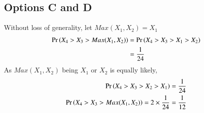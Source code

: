 \documentclass[journal,12pt,twocolumn]{IEEEtran}
\theoremstyle{definition}
\begin{document}
\subsection*{\textbf{Options C and D}}      
Without loss of generality, let $Max(X_1,X_2) = X_1$
\begin{align}
    \Pr\left(X_4 > X_3 > Max(X_1,X_2)\right) &= \Pr\left(X_4 > X_3 > X_1 > X_2\right)\\ &= \frac{1}{24} 
\end{align}
As $Max(X_1,X_2)$ being $X_1$ or $X_2$ is equally likely,
\begin{align}
    \Pr\left(X_4 > X_3 > X_2 > X_1\right) = \frac{1}{24} \\
    \Pr\left(X_4 > X_3 > Max(X_1,X_2)\right) = 2 \times \frac{1}{24} = \frac{1}{12}
\end{align}

\bigskip
{}
\end{document}
